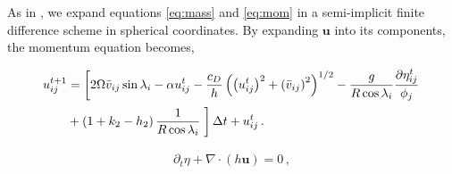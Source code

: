 As in \citep{sears1995tidal}, we expand equations \ref{eq:mass} and \ref{eq:mom} in a semi-implicit finite difference scheme in spherical coordinates. By expanding $\bm{u}$ into its components, the momentum equation becomes,

\begin{equation}
\begin{split}
u_{ij}^{t+1} &= \left[ 2 \Omega \bar{v}_{ij} \sin{\lambda_i} - \alpha u_{ij}^{t} - \frac{c_D}{h}\left(\left(u_{ij}^{t}\right)^2 + \left(\bar{v}_{ij}\right)^2\right)^{1/2} - \frac{g}{R \cos{\lambda_i}} \frac{\partial \eta_{ij}^{t}}{\phi_j}\right. \\ &+ \left(1 + k_2 - h_2\right) \frac{1}{R \cos{\lambda_i}} \left.\vphantom{\frac{\partial U_{2,ij}^{t}}{\partial \phi_j}} \right] \Delta t + u_{ij}^{t} \, . \label{eq:momu_fd}
\end{split}
\end{equation}

\begin{equation}
\begin{split}
\partial_t \eta + \nabla \cdot \left(h \bm{u}\right) = 0\, , \label{eq:mass_fd}\\ 
\end{split}
\end{equation}





